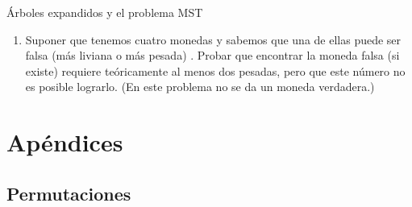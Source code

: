 \begin{section}{Árboles expandidos y el problema MST}
\begin{enumerate}
 \item Suponer que tenemos cuatro monedas y sabemos que una de ellas puede ser falsa (más liviana o más pesada) . Probar que encontrar la moneda falsa (si existe) requiere teóricamente al menos dos pesadas, pero que este número no es posible lograrlo. (En este problema no se da un moneda verdadera.)
\end{enumerate}

\end{section}


\appendix

\part{Ap\'endices} 

\setcounter{chapter}{0}
\renewcommand{\thechapter}{\Alph{chapter}}


\chapter[Permutaciones]{Permutaciones}


